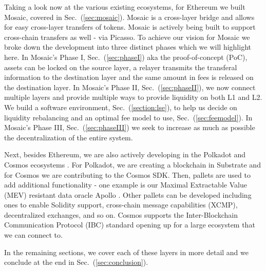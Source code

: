 Taking a look now at the various existing ecosystems, for Ethereum we built Mosaic, covered in Sec.~(\ref{sec:mosaic}). Mosaic is a cross-layer bridge and allows for easy cross-layer transfers of tokens.
%
Mosaic is actively being built to support cross-chain transfers as well - via Picasso. To achieve our vision for Mosaic we broke down the development into three distinct phases which we will highlight here.
%
In Mosaic's Phase I, Sec.~(\ref{sec:phaseI}) aka the proof-of-concept (PoC), assets can be locked on the source layer, a relayer transmits the transferal information to the destination layer and the same amount in fees is released on the destination layer.
%
In Mosaic's Phase II, Sec.~(\ref{sec:phaseII}), we now connect multiple layers and provide multiple ways to provide liquidity on both L1 and L2. We build a software environment, Sec.~(\ref{section:lse}), to help us decide on liquidity rebalancing and an optimal fee model to use, Sec.~(\ref{sec:feemodel}).
%
In Mosaic's Phase III, Sec.~(\ref{sec:phaseIII}) we seek to increase as much as possible the decentralization of the entire system.

Next, besides Ethereum, we are also actively developing in the Polkadot and Cosmos ecosystems \cite{Cosmos:Blockchains}.
%
For Polkadot, we are creating a blockchain in Substrate \cite{HomeSubstrate_} and for Cosmos we are contributing to the Cosmos SDK.
%
Then, pallets \cite{TheMedium} are used to add additional functionality - one example is our Maximal Extractable Value (MEV) \cite{MinerEthereum.org} resistant data oracle Apollo \cite{Apollo:Finance}.
%
Other pallets can be developed including ones to enable Solidity support, cross-chain message capabilities (XCMP), decentralized exchanges, and so on.
%
Cosmos supports the Inter-Blockchain Communication Protocol (IBC) \cite{Inter-BlockchainCommunication} standard opening up for a large ecosystem that we can connect to.

In the remaining sections, we cover each of these layers in more detail and we conclude at the end in Sec.~(\ref{sec:conclusion}).
